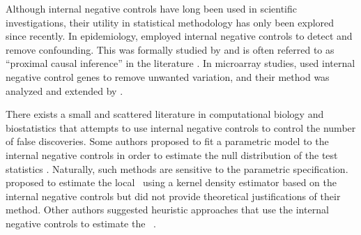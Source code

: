 \documentclass[a4paper,11pt]{article}
\theoremstyle{plain}
\theoremstyle{definition}
\theoremstyle{plain}
\newcommand{\FDR}{\text{FDR}}
\begin{document}


Although internal negative controls have long been used in scientific
investigations, their utility in statistical methodology has only been
explored since recently. In epidemiology, \textcite{lipsitch2010negative}
employed internal negative controls to detect and remove
confounding. This was formally studied by
\textcite{miao18_ident_causal_effec_with_proxy} and is often referred
to as ``proximal causal inference'' in the literature
\parencite{tchetgen20_introd_to_proxim_causal_learn}.
In microarray studies, \textcite{gagnon2012using} used internal negative
control genes to remove unwanted variation, and their
method was analyzed and extended by \textcite{wang2017confounder}.

There exists a small and scattered literature in computational biology and
biostatistics that attempts to use internal negative controls to
control the number of false discoveries. Some authors proposed to fit
a parametric model to the internal negative controls in order to
estimate the null distribution of the test statistics
\cite{nix2008empirical, listgarten2013powerful,
  slattery2011cofactor}. Naturally, such methods are sensitive to the
parametric specification. \textcite{parks2018using}
proposed to estimate the local \FDR~using a kernel density
estimator based on the internal negative controls but did not provide
theoretical justifications of their method. Other authors suggested
heuristic approaches that use the internal negative controls
to estimate the \FDR~\parencite{zhang2008model,
  song2007model}.
\end{document}
